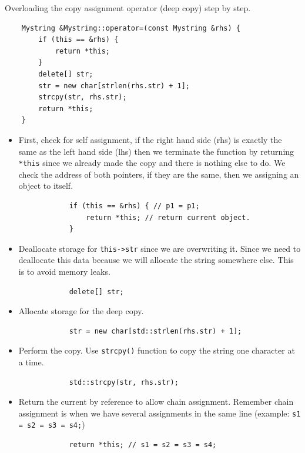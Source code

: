 Overloading the copy assignment operator (deep copy) step by step.
\begin{verbatim}
    Mystring &Mystring::operator=(const Mystring &rhs) {
        if (this == &rhs) {
            return *this;
        }
        delete[] str;
        str = new char[strlen(rhs.str) + 1];
        strcpy(str, rhs.str);
        return *this;
    }
\end{verbatim}
\begin{itemize}
    \item First, check for self assignment, if the right hand side (rhs) is exactly the same as the left hand side (lhs) then we terminate the function by returning \texttt{*this} since we already made the copy and there is nothing else to do. We check the address of both pointers, if they are the same, then we assigning an object to itself.
        \begin{verbatim}
            if (this == &rhs) { // p1 = p1;
                return *this; // return current object.
            }
        \end{verbatim}
    
    \item Deallocate storage for \texttt{this->str} since we are overwriting it. Since we need to deallocate this data because we will allocate the string somewhere else. This is to avoid memory leaks.
        \begin{verbatim}
            delete[] str;
        \end{verbatim}
    
    \item Allocate storage for the deep copy.
        \begin{verbatim}
            str = new char[std::strlen(rhs.str) + 1];
        \end{verbatim}
    
    \item Perform the copy. Use \texttt{strcpy()} function to copy the string one character at a time.
        \begin{verbatim}
            std::strcpy(str, rhs.str);
        \end{verbatim}
    
    \item Return the current by reference to allow chain assignment. Remember chain assignment is when we have several assignments in the same line (example: \texttt{s1 = s2 = s3 = s4;})
        \begin{verbatim}
            return *this; // s1 = s2 = s3 = s4;
        \end{verbatim}
\end{itemize}

